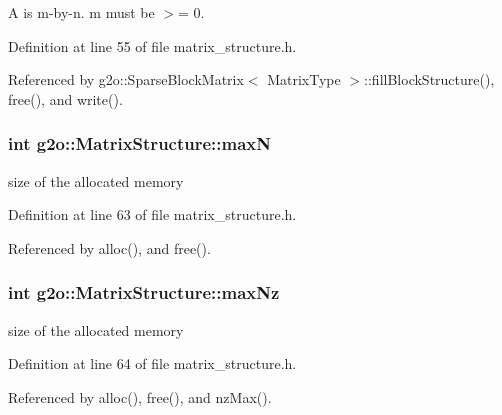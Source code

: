 A is m-\/by-\/n. m must be $>$= 0. 



Definition at line 55 of file matrix\+\_\+structure.\+h.



Referenced by g2o\+::\+Sparse\+Block\+Matrix$<$ Matrix\+Type $>$\+::fill\+Block\+Structure(), free(), and write().

\subsubsection[{\texorpdfstring{maxN}{maxN}}]{\setlength{\rightskip}{0pt plus 5cm}int g2o\+::\+Matrix\+Structure\+::maxN\hspace{0.3cm}{\ttfamily [protected]}}\hypertarget{classg2o_1_1MatrixStructure_a098e58ed3d37bf957307a64f7dc55f32}{}\label{classg2o_1_1MatrixStructure_a098e58ed3d37bf957307a64f7dc55f32}


size of the allocated memory 



Definition at line 63 of file matrix\+\_\+structure.\+h.



Referenced by alloc(), and free().

\subsubsection[{\texorpdfstring{max\+Nz}{maxNz}}]{\setlength{\rightskip}{0pt plus 5cm}int g2o\+::\+Matrix\+Structure\+::max\+Nz\hspace{0.3cm}{\ttfamily [protected]}}\hypertarget{classg2o_1_1MatrixStructure_a049708086bd4123721351d0580ce5ba1}{}\label{classg2o_1_1MatrixStructure_a049708086bd4123721351d0580ce5ba1}


size of the allocated memory 



Definition at line 64 of file matrix\+\_\+structure.\+h.



Referenced by alloc(), free(), and nz\+Max().

